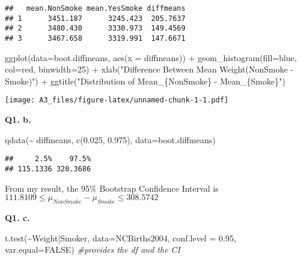 \documentclass[
]{article}
\newenvironment{Shaded}{\begin{snugshade}}{\end{snugshade}}
\newcommand{\AttributeTok}[1]{\textcolor[rgb]{0.77,0.63,0.00}{#1}}
\newcommand{\CommentTok}[1]{\textcolor[rgb]{0.56,0.35,0.01}{\textit{#1}}}
\newcommand{\ConstantTok}[1]{\textcolor[rgb]{0.00,0.00,0.00}{#1}}
\newcommand{\DecValTok}[1]{\textcolor[rgb]{0.00,0.00,0.81}{#1}}
\newcommand{\FloatTok}[1]{\textcolor[rgb]{0.00,0.00,0.81}{#1}}
\newcommand{\FunctionTok}[1]{\textcolor[rgb]{0.00,0.00,0.00}{#1}}
\newcommand{\NormalTok}[1]{#1}
\newcommand{\SpecialCharTok}[1]{\textcolor[rgb]{0.00,0.00,0.00}{#1}}
\newcommand{\StringTok}[1]{\textcolor[rgb]{0.31,0.60,0.02}{#1}}
\begin{document}
\begin{verbatim}
##   mean.NonSmoke mean.YesSmoke diffmeans
## 1      3451.187      3245.423  205.7637
## 2      3480.430      3330.973  149.4569
## 3      3467.658      3319.991  147.6671
\end{verbatim}

\begin{Shaded}
\begin{Highlighting}[]
\FunctionTok{ggplot}\NormalTok{(}\AttributeTok{data=}\NormalTok{boot.diffmeans, }\FunctionTok{aes}\NormalTok{(}\AttributeTok{x =}\NormalTok{ diffmeans)) }\SpecialCharTok{+} \FunctionTok{geom\_histogram}\NormalTok{(}\AttributeTok{fill=}\StringTok{\textquotesingle{}blue\textquotesingle{}}\NormalTok{, }\AttributeTok{col=}\StringTok{\textquotesingle{}red\textquotesingle{}}\NormalTok{, }\AttributeTok{binwidth=}\DecValTok{25}\NormalTok{) }\SpecialCharTok{+} \FunctionTok{xlab}\NormalTok{(}\StringTok{"Difference Between Mean Weight(NonSmoke {-} Smoke)"}\NormalTok{) }\SpecialCharTok{+} \FunctionTok{ggtitle}\NormalTok{(}\StringTok{"Distribution of Mean\_\{NonSmoke\} {-} Mean\_\{Smoke\}"}\NormalTok{)}
\end{Highlighting}
\end{Shaded}

\texttt{[image: A3\_files/figure-latex/unnamed-chunk-1-1.pdf]}

\textbf{Q1. b.}

\begin{Shaded}
\begin{Highlighting}[]
\FunctionTok{qdata}\NormalTok{(}\SpecialCharTok{\textasciitilde{}}\NormalTok{ diffmeans, }\FunctionTok{c}\NormalTok{(}\FloatTok{0.025}\NormalTok{, }\FloatTok{0.975}\NormalTok{), }\AttributeTok{data=}\NormalTok{boot.diffmeans) }
\end{Highlighting}
\end{Shaded}

\begin{verbatim}
##     2.5%    97.5% 
## 115.1336 320.3686
\end{verbatim}

From my result, the 95\% Bootstrap Confidence Interval is
\(111.8109 \leq \mu_{NonSmoke} - \mu_{Smoke} \leq 308.5742\)

\textbf{Q1. c.}

\begin{Shaded}
\begin{Highlighting}[]
\FunctionTok{t.test}\NormalTok{(}\SpecialCharTok{\textasciitilde{}}\NormalTok{Weight}\SpecialCharTok{|}\NormalTok{Smoker, }\AttributeTok{data=}\NormalTok{NCBirths2004, }\AttributeTok{conf.level =} \FloatTok{0.95}\NormalTok{, }\AttributeTok{var.equal=}\ConstantTok{FALSE}\NormalTok{)  }\CommentTok{\#provides the df and the CI}
\end{Highlighting}
\end{Shaded}
\end{document}
